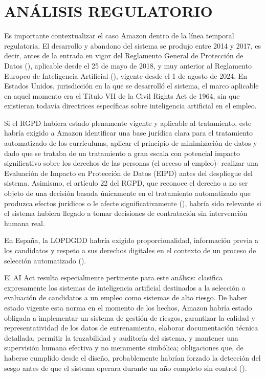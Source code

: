 \chapter{ANÁLISIS REGULATORIO}

Es importante contextualizar el caso Amazon dentro de la línea temporal regulatoria. El desarrollo y abandono del sistema se produjo entre 2014 y 2017, es decir, antes de la entrada en vigor del Reglamento General de Protección de Datos (\textcite{rgpd2016}), aplicable desde el 25 de mayo de 2018, y muy anterior al Reglamento Europeo de Inteligencia Artificial (\textcite{aiact2024}), vigente desde el 1 de agosto de 2024. En Estados Unidos, jurisdicción en la que se desarrolló el sistema, el marco aplicable en aquel momento era el Título VII de la Civil Rights Act de 1964, sin que existieran todavía directrices específicas sobre inteligencia artificial en el empleo.

Si el RGPD hubiera estado plenamente vigente y aplicable al tratamiento, este habría exigido a Amazon identificar una base jurídica clara para el tratamiento automatizado de los currículums, aplicar el principio de minimización de datos y -dado que se trataba de un tratamiento a gran escala con potencial impacto significativo sobre los derechos de las personas (el acceso al empleo)- realizar una Evaluación de Impacto en Protección de Datos (EIPD) antes del despliegue del sistema. Asimismo, el artículo 22 del RGPD, que reconoce el derecho a no ser objeto de una decisión basada únicamente en el tratamiento automatizado que produzca efectos jurídicos o le afecte significativamente (\textcite{rgpd2016}), habría sido relevante si el sistema hubiera llegado a tomar decisiones de contratación sin intervención humana real.

En España, la LOPDGDD habría exigido proporcionalidad, información previa a los candidatos y respeto a sus derechos digitales en el contexto de un proceso de selección automatizado (\textcite{lopdgdd2018}).

El AI Act resulta especialmente pertinente para este análisis: clasifica expresamente los sistemas de inteligencia artificial destinados a la selección o evaluación de candidatos a un empleo como sistemas de alto riesgo. De haber estado vigente esta norma en el momento de los hechos, Amazon habría estado obligada a implementar un sistema de gestión de riesgos, garantizar la calidad y representatividad de los datos de entrenamiento, elaborar documentación técnica detallada, permitir la trazabilidad y auditoría del sistema, y mantener una supervisión humana efectiva y no meramente simbólica; obligaciones que, de haberse cumplido desde el diseño, probablemente habrían forzado la detección del sesgo antes de que el sistema operara durante un año completo sin control (\textcite{aiact2024}).

